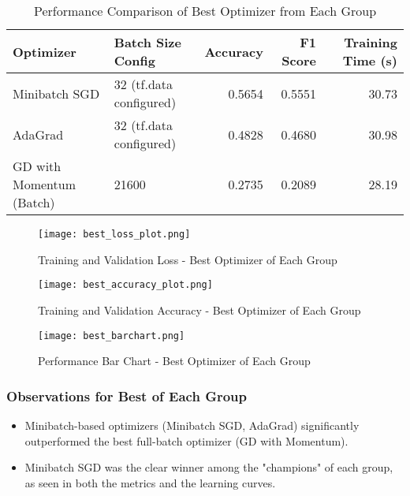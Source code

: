 \documentclass[11pt,a4paper]{article}
\begin{document}
\begin{table}[H]
    \centering
    \caption{Performance Comparison of Best Optimizer from Each Group}
    \label{tab:best_of_groups_summary}
    \begin{tabular}{@{}llrrr@{}}
        \toprule
        Optimizer                & Batch Size Config        & Accuracy & F1 Score & Training Time (s) \\ \midrule
        Minibatch SGD          & 32 (tf.data configured)  & 0.5654   & 0.5551   & 30.73             \\
        AdaGrad                  & 32 (tf.data configured)  & 0.4828   & 0.4680   & 30.98             \\
        GD with Momentum (Batch) & 21600                    & 0.2735   & 0.2089   & 28.19             \\ \bottomrule
    \end{tabular}
\end{table}

\begin{figure}[H]
    \centering
    \texttt{[image: best\_loss\_plot.png]} %
    \caption{Training and Validation Loss - Best Optimizer of Each Group}
    \label{fig:best_loss}
\end{figure}
\begin{figure}[H]
    \centering
    \texttt{[image: best\_accuracy\_plot.png]} %
    \caption{Training and Validation Accuracy - Best Optimizer of Each Group}
    \label{fig:best_accuracy}
\end{figure}
\begin{figure}[H]
    \centering
    \texttt{[image: best\_barchart.png]} %
    \caption{Performance Bar Chart - Best Optimizer of Each Group}
    \label{fig:best_barchart}
\end{figure}
\clearpage

\subsubsection{Observations for Best of Each Group}
\begin{itemize}
    \item Minibatch-based optimizers (Minibatch SGD, AdaGrad) significantly outperformed the best full-batch optimizer (GD with Momentum).
    \item Minibatch SGD was the clear winner among the "champions" of each group, as seen in both the metrics and the learning curves.
\end{itemize}
\end{document}
